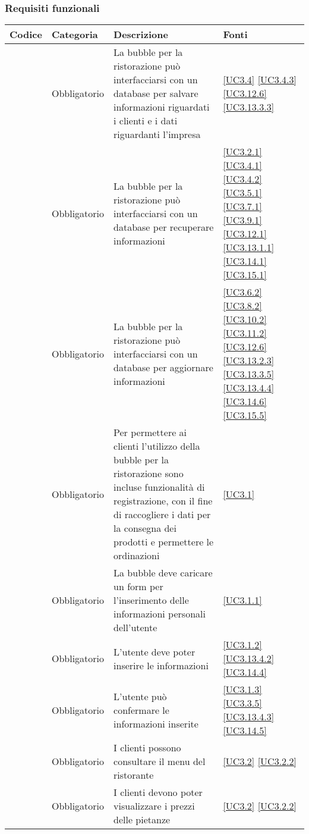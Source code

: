 \subsubsection{Requisiti funzionali}

\begin{longtable}{|P{1.5cm}|P{2.5cm}|P{6.5cm}|P{2.5cm}|}
	\hline \textbf{Codice} & \textbf{Categoria} & \textbf{Descrizione} & \textbf{Fonti} \\
	
	\hline \RequisitoObF\label{L21} & Obbligatorio & La bubble per la ristorazione può interfacciarsi con un database per salvare informazioni riguardati i clienti e i dati riguardanti l'impresa & \ref{UC3.4} \ref{UC3.4.3} \ref{UC3.12.6} \ref{UC3.13.3.3} \\
	\hline \RequisitoObF\label{L61} & Obbligatorio & La bubble per la ristorazione può interfacciarsi con un database per recuperare informazioni & \ref{UC3.2.1} \ref{UC3.4.1} \ref{UC3.4.2} \ref{UC3.5.1} \ref{UC3.7.1}  \ref{UC3.9.1} \ref{UC3.12.1} \ref{UC3.13.1.1} \ref{UC3.14.1} \ref{UC3.15.1} \\
	\hline \RequisitoObF\label{L62} & Obbligatorio & La bubble per la ristorazione può interfacciarsi con un database per aggiornare informazioni & \ref{UC3.6.2} \ref{UC3.8.2} \ref{UC3.10.2} \ref{UC3.11.2} \ref{UC3.12.6}  \ref{UC3.13.2.3} \ref{UC3.13.3.5} \ref{UC3.13.4.4} \ref{UC3.14.6} \ref{UC3.15.5} \\	
	\hline \RequisitoObF\label{L22} & Obbligatorio & Per permettere ai clienti l'utilizzo della bubble per la ristorazione sono incluse funzionalità di registrazione, con il fine di raccogliere i dati per la consegna dei prodotti e permettere le ordinazioni & \ref{UC3.1} \\
	\hline \RequisitoObF\label{L96} & Obbligatorio & La bubble deve caricare un form per l'inserimento delle informazioni personali dell'utente & \ref{UC3.1.1} \\
	\hline \RequisitoObF\label{L97} & Obbligatorio & L'utente deve poter inserire le informazioni & \ref{UC3.1.2} \ref{UC3.13.4.2} \ref{UC3.14.4}\\
	\hline \RequisitoObF\label{L98} & Obbligatorio & L'utente può confermare le informazioni inserite & \ref{UC3.1.3} \ref{UC3.3.5} \ref{UC3.13.4.3} \ref{UC3.14.5}\\
	\hline \RequisitoObF\label{L23} & Obbligatorio & I clienti possono consultare il menu del ristorante & \ref{UC3.2} \ref{UC3.2.2}\\
	\hline \RequisitoObF \label{L68} & Obbligatorio & I clienti devono poter visualizzare i prezzi delle pietanze & \ref{UC3.2} \ref{UC3.2.2}\\

\end{longtable}
